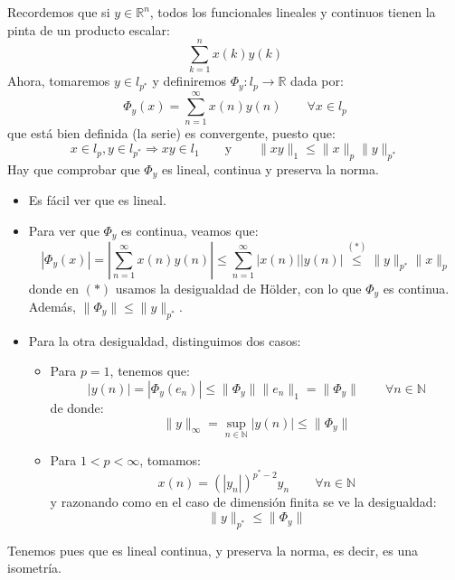 \noindent
Recordemos que si $y\in \mathbb{R}^n$, todos los funcionales lineales y continuos tienen la pinta de un producto escalar:
\begin{equation*}
    \sum_{k=1}^{n}x(k)y(k)
\end{equation*}
Ahora, tomaremos $y\in l_{p^\ast}$ y definiremos $\Phi_y:l_p\to \mathbb{R}$ dada por:
\begin{equation*}
    \Phi_y(x) = \sum_{n=1}^{\infty}x(n)y(n) \qquad \forall x\in l_p
\end{equation*}
que está bien definida (la serie) es convergente, puesto que:
\begin{equation*}
    x\in l_p, y\in l_{p^\ast} \Longrightarrow xy \in l_1 \qquad \text{y}\qquad \|xy\|_1 \leq \|x\|_p \|y\|_{p^\ast}
\end{equation*}
Hay que comprobar que $\Phi_y$ es lineal, continua y preserva la norma.
\begin{itemize}
    \item Es fácil ver que es lineal.
    \item Para ver que $\Phi_y$ es continua, veamos que:
        \begin{equation*}
            |\Phi_y(x)| = \left|\sum_{n=1}^{\infty}x(n)y(n)\right| \leq \sum_{n=1}^{\infty}|x(n)||y(n)| \stackrel{(\ast)}{\leq} \|y\|_{p^\ast}\|x\|_p
        \end{equation*}
        donde en $(\ast)$ usamos la desigualdad de Hölder, con lo que $\Phi_y$ es continua. Además, $\|\Phi_y\| \leq \|y\|_{p^\ast}$.
    \item Para la otra desigualdad, distinguimos dos casos:
        \begin{itemize}
            \item Para $p=1$, tenemos que:
                \begin{equation*}
                    |y(n)| = |\Phi_y(e_n)| \leq \|\Phi_y\| \|e_n\|_1 = \|\Phi_y\| \qquad \forall n\in \mathbb{N}
                \end{equation*}
                de donde:
                \begin{equation*}
                    \|y\|_\infty = \sup_{n\in \mathbb{N}}|y(n)| \leq \|\Phi_y\|
                \end{equation*}
            \item Para $1<p<\infty$, tomamos:
                \begin{equation*}
                    x(n) = {(|y_n|)}^{p^\ast-2}y_n \qquad \forall n\in \mathbb{N}
                \end{equation*}
                y razonando como en el caso de dimensión finita se ve la desigualdad:
                \begin{equation*}
                    \|y\|_{p^\ast} \leq \|\Phi_y\|
                \end{equation*}
        \end{itemize}
\end{itemize}
Tenemos pues que 
es lineal continua, y preserva la norma, es decir, es una isometría.

